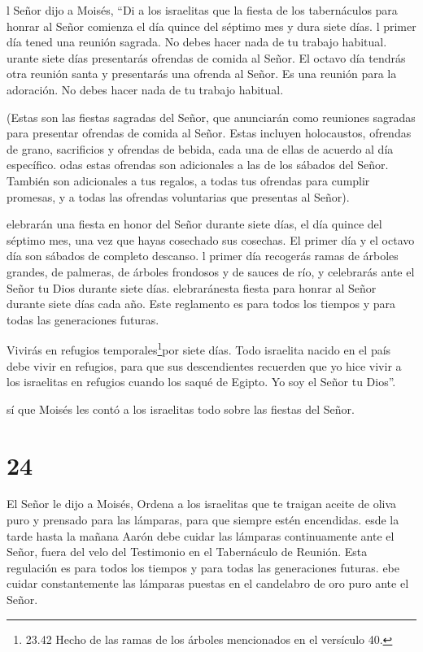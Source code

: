  l Señor dijo a Moisés,  ``Di a los israelitas
que la fiesta de los tabernáculos para honrar al Señor comienza el día
quince del séptimo mes y dura siete días.  l primer día
tened una reunión sagrada. No debes hacer nada de tu trabajo habitual.
 urante siete días presentarás ofrendas de comida al Señor.
El octavo día tendrás otra reunión santa y presentarás una ofrenda al
Señor. Es una reunión para la adoración. No debes hacer nada de tu
trabajo habitual.

 (Estas son las fiestas sagradas del Señor, que anunciarán
como reuniones sagradas para presentar ofrendas de comida al Señor.
Estas incluyen holocaustos, ofrendas de grano, sacrificios y ofrendas de
bebida, cada una de ellas de acuerdo al día específico. 
odas estas ofrendas son adicionales a las de los sábados del Señor.
También son adicionales a tus regalos, a todas tus ofrendas para cumplir
promesas, y a todas las ofrendas voluntarias que presentas al Señor).

 elebrarán una fiesta en honor del Señor durante siete
días, el día quince del séptimo mes, una vez que hayas cosechado sus
cosechas. El primer día y el octavo día son sábados de completo
descanso.  l primer día recogerás ramas de árboles grandes,
de palmeras, de árboles frondosos y de sauces de río, y celebrarás ante
el Señor tu Dios durante siete días.  elebraránesta fiesta
para honrar al Señor durante siete días cada año. Este reglamento es
para todos los tiempos y para todas las generaciones futuras.

 Vivirás en refugios temporales\footnote{23.42 Hecho de las
  ramas de los árboles mencionados en el versículo 40.}por siete días.
Todo israelita nacido en el país debe vivir en refugios, 
para que sus descendientes recuerden que yo hice vivir a los israelitas
en refugios cuando los saqué de Egipto. Yo soy el Señor tu Dios''.

 sí que Moisés les contó a los israelitas todo sobre las
fiestas del Señor.

\hypertarget{section-23}{%
\section{24}\label{section-23}}

 El Señor le dijo a Moisés,  Ordena a los
israelitas que te traigan aceite de oliva puro y prensado para las
lámparas, para que siempre estén encendidas.  esde la tarde
hasta la mañana Aarón debe cuidar las lámparas continuamente ante el
Señor, fuera del velo del Testimonio en el Tabernáculo de Reunión. Esta
regulación es para todos los tiempos y para todas las generaciones
futuras.  ebe cuidar constantemente las lámparas puestas en
el candelabro de oro puro ante el Señor.

